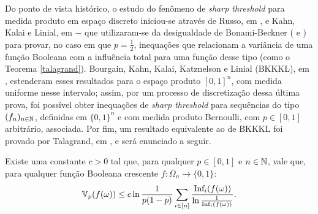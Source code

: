 \par Do ponto de vista histórico, o estudo do fenômeno de \textit{sharp threshold} para medida produto em espaço discreto iniciou-se através de Russo, em \cite{russo1982approximate}, e Kahn, Kalai e Linial, em \cite{kahn1988influence} $-$ que utilizaram-se da desigualdade de Bonami-Beckner (\cite{beckner1975inequalities} e \cite{bonami1970etude}) para provar, no caso em que $p = \frac{1}{2}$, inequações que relacionam a variância de uma função Booleana com a influência total para uma função desse tipo (como o Teorema \ref{talagrand}). Bourgain, Kahn, Kalai, Katznelson e Linial (BKKKL), em \cite{bourgain1992influence}, estenderam esses resultados para o espaço produto $[0,1]^n$, com medida uniforme nesse intervalo; assim, por um processo de discretização dessa última prova, foi possível obter inequações de \textit{sharp threshold} para sequências do tipo $(f_n)_{n\in\operatorname{\mathbb{N}}}$, definidas em $\{0,1\}^n$ e com medida produto Bernoulli, com $p \in [0,1]$ arbitrário, associada. Por fim, um resultado equivalente ao de BKKKL foi provado por Talagrand, em \cite{talagrand1994russo}, e será enunciado a seguir.

\begin{mythm}\label{talagrand}
	Existe uma constante $c > 0$ tal que, para qualquer $p \in [0,1]$ e $n \in \operatorname{\mathbb{N}}$, vale que, para qualquer função Booleana crescente $f: \Omega_n \longrightarrow \{0,1\}$:
	\begin{align}\label{talagrand-main-inequality}
		\operatorname{\mathbb{V}}_p(f(\omega)) \leq c \ln\frac{1}{p(1-p)} \sum_{i \in [n]} \frac{\text{Inf}_i(f(\omega))}{\ln\frac{1}{\text{Inf}_i(f(\omega))}}.
	\end{align}
\end{mythm}

